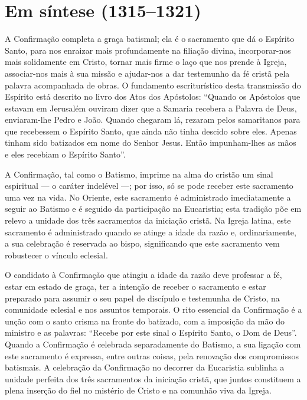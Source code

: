 \section{Em síntese (1315--1321)}

A Confirmação completa a graça batismal; ela é o sacramento que dá o Espírito Santo, para nos enraizar mais profundamente na filiação divina, incorporar-nos mais solidamente em Cristo, tornar mais firme o laço que nos prende à Igreja, associar-nos mais à sua missão e ajudar-nos a dar testemunho da fé cristã pela palavra acompanhada de obras. O fundamento escriturístico desta transmissão do Espírito está descrito no livro dos Atos dos Apóstolos: ``Quando os Apóstolos que estavam em Jerusalém ouviram dizer que a Samaria recebera a Palavra de Deus, enviaram-lhe Pedro e João. Quando chegaram lá, rezaram pelos samaritanos para que recebessem o Espírito Santo, que ainda não tinha descido sobre eles. Apenas tinham sido batizados em nome do Senhor Jesus. Então impunham-lhes as mãos e eles recebiam o Espírito Santo''.

A Confirmação, tal como o Batismo, imprime na alma do cristão um sinal espiritual --- o caráter indelével ---; por isso, só se pode receber este sacramento uma vez na vida. No Oriente, este sacramento é administrado imediatamente a seguir ao Batismo e é seguido da participação na Eucaristia; esta tradição põe em relevo a unidade dos três sacramentos da iniciação cristã. Na Igreja latina, este sacramento é administrado quando se atinge a idade da razão e, ordinariamente, a sua celebração é reservada ao bispo, significando que este sacramento vem robustecer o vínculo eclesial.

O candidato à Confirmação que atingiu a idade da razão deve professar a fé, estar em estado de graça, ter a intenção de receber o sacramento e estar preparado para assumir o seu papel de discípulo e testemunha de Cristo, na comunidade eclesial e nos assuntos temporais. O rito essencial da Confirmação é a unção com o santo crisma na fronte do batizado, com a imposição da mão do ministro e as palavras: ``Recebe por este sinal o Espírito Santo, o Dom de Deus''. Quando a Confirmação é celebrada separadamente do Batismo, a sua ligação com este sacramento é expressa, entre outras coisas, pela renovação dos compromissos batismais. A celebração da Confirmação no decorrer da Eucaristia sublinha a unidade perfeita dos três sacramentos da iniciação cristã, que juntos constituem a plena inserção do fiel no mistério de Cristo e na comunhão viva da Igreja.
